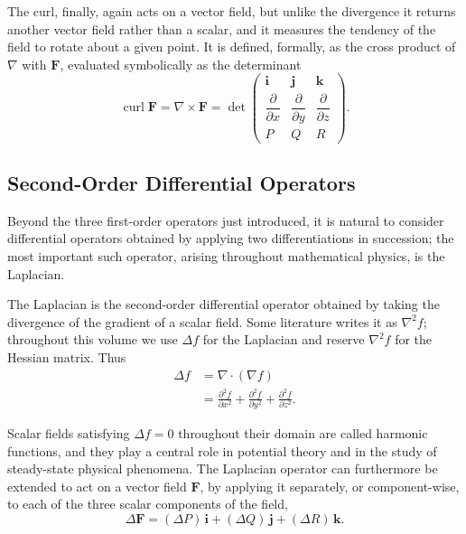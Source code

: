 The curl, finally, again acts on a vector field, but unlike the divergence it returns another vector field rather than a scalar, and it measures the tendency of the field to rotate about a given point. It is defined, formally, as the cross product of $\nabla$ with $\mathbf{F}$, evaluated symbolically as the determinant
\[
\operatorname{curl} \mathbf{F} = \nabla \times \mathbf{F} = \det \begin{pmatrix} \mathbf{i} & \mathbf{j} & \mathbf{k} \\[1mm] \dfrac{\partial}{\partial x} & \dfrac{\partial}{\partial y} & \dfrac{\partial}{\partial z} \\[2mm] P & Q & R \end{pmatrix}.
\]

\subsection{Second-Order Differential Operators}

Beyond the three first-order operators just introduced, it is natural to consider differential operators obtained by applying two differentiations in succession; the most important such operator, arising throughout mathematical physics, is the Laplacian.

The Laplacian is the second-order differential operator obtained by taking
the divergence of the gradient of a scalar field. Some literature writes
it as $\nabla^2 f$; throughout this volume we use $\Delta f$ for the
Laplacian and reserve $\nabla^2 f$ for the Hessian matrix. Thus
\[
\begin{aligned}
\Delta f &= \nabla \cdot (\nabla f) \\[0.5em]
&= \frac{\partial^2 f}{\partial x^2} + \frac{\partial^2 f}{\partial y^2} + \frac{\partial^2 f}{\partial z^2}.
\end{aligned}
\]

Scalar fields satisfying $\Delta f = 0$ throughout their domain are called harmonic functions, and they play a central role in potential theory and in the study of steady-state physical phenomena. The Laplacian operator can furthermore be extended to act on a vector field $\mathbf{F}$, by applying it separately, or component-wise, to each of the three scalar components of the field,
\[
\Delta \mathbf{F} = (\Delta P) \, \mathbf{i} + (\Delta Q) \, \mathbf{j} + (\Delta R) \, \mathbf{k}.
\]

